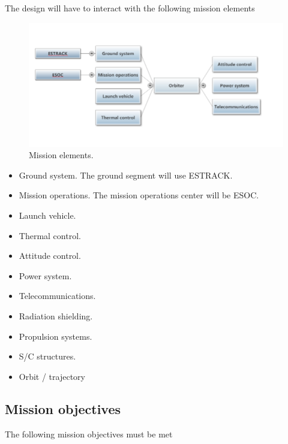 

The design will have to interact with the following mission elements

\begin{figure}[h]
  \caption{Mission elements.}
  \includegraphics[width=\textwidth]{block-diagram-WP1-1B}
\end{figure}

\begin{itemize}
\item{Ground system.} The ground segment will use ESTRACK.
\item{Mission operations.} The mission operations center will be ESOC.
\item{Launch vehicle.}
\item{Thermal control.}
\item{Attitude control.}
\item{Power system.}
\item{Telecommunications.}
\item{Radiation shielding.}
\item{Propulsion systems.}
\item{S/C structures.}
\item{Orbit / trajectory}
\end{itemize}



\subsection{Mission objectives}
The following mission objectives must be met


